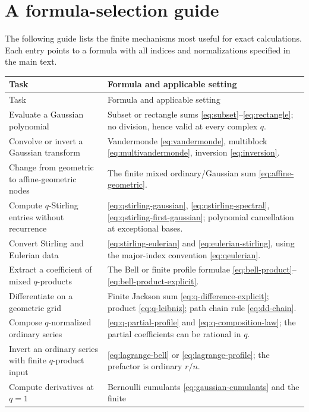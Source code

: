 \documentclass[11pt,a4paper]{article}
\numberwithin{equation}{section}
\theoremstyle{definition}
\theoremstyle{remark}
\begin{document}
\section{A formula-selection guide}
\label{app:guide}
The following guide lists the finite mechanisms most useful for exact
calculations. Each entry points to a formula with all indices and
normalizations specified in the main text.
\begin{longtable}{@{}>{\raggedright\arraybackslash}p{}>{\raggedright\arraybackslash}p{}@{}}
\toprule
Task & Formula and applicable setting\\
\midrule
\endfirsthead
\toprule
Task & Formula and applicable setting\\
\midrule
\endhead
Evaluate a Gaussian polynomial & Subset or rectangle sums
\eqref{eq:subset}--\eqref{eq:rectangle}; no division, hence valid at every
complex $q$.\\[3pt]
Convolve or invert a Gaussian transform &
Vandermonde \eqref{eq:vandermonde}, multiblock
\eqref{eq:multivandermonde}, inversion \eqref{eq:inversion}.\\[3pt]
Change from geometric to affine-geometric nodes &
The finite mixed ordinary/Gaussian sum \eqref{eq:affine-geometric}.\\[3pt]
Compute $q$-Stirling entries without recurrence &
\eqref{eq:qstirling-gaussian}, \eqref{eq:qstirling-spectral},
\eqref{eq:qstirling-first-gaussian}; polynomial cancellation at exceptional
bases.\\[3pt]
Convert Stirling and Eulerian data &
\eqref{eq:stirling-eulerian} and \eqref{eq:eulerian-stirling}, using the
major-index convention \eqref{eq:qeulerian}.\\[3pt]
Extract a coefficient of mixed $q$-products &
The Bell or finite profile formulae
\eqref{eq:bell-product}--\eqref{eq:bell-product-explicit}.\\[3pt]
Differentiate on a geometric grid &
Finite Jackson sum \eqref{eq:q-difference-explicit}; product
\eqref{eq:q-leibniz}; path chain rule \eqref{eq:dd-chain}.\\[3pt]
Compose $q$-normalized ordinary series &
\eqref{eq:q-partial-profile} and \eqref{eq:q-composition-law}; the partial
coefficients can be rational in $q$.\\[3pt]
Invert an ordinary series with finite $q$-product input &
\eqref{eq:lagrange-bell} or \eqref{eq:lagrange-profile}; the prefactor is
ordinary $r/n$.\\[3pt]
Compute derivatives at $q=1$ &
Bernoulli cumulants \eqref{eq:gaussian-cumulants} and the finite

\end{longtable}
\end{document}
